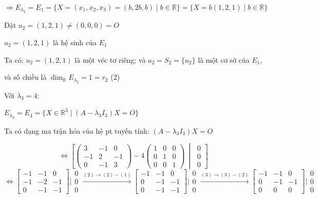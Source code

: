 \documentclass[12pt,a4paper]{article}
\newcommand{\R}{\mathbb{R}}
\begin{document}
\[
\Rightarrow E_{\lambda_2}=E_1=\{X=(x_1,x_2,x_3)=(b,2b,b)\mid b\in\R\}=\{X=b(1,2,1)\mid b\in\R\}
\]

Đặt $u_2=(1,2,1)\neq(0,0,0)=O$

$u_2=(1,2,1)$ là hệ sinh của $E_1$

Ta có: $u_2=(1,2,1)$ là một véc tơ riêng; và $a_2=S_2=\{u_2\}$ là một cơ sở của $E_1$,

và số chiều là $\dim_\R E_{\lambda_2}=1=r_2$ \hfill (2)

\medskip
Với $\lambda_3=4$:

$E_{\lambda_3}=E_4=\{X\in\R^3 \mid (A-\lambda_3I_3)X=O\}$

Ta có dạng ma trận hóa của hệ pt tuyến tính: $(A-\lambda_3I_3)X=O$

\[
\Leftrightarrow
\left[\begin{pmatrix}3 & -1 & 0\\ -1 & 2 & -1\\ 0 & -1 & 3\end{pmatrix}-4\begin{pmatrix}1&0&0\\0&1&0\\0&0&1\end{pmatrix}\ \middle|\ \begin{matrix}0\\0\\0\end{matrix}\right]
\]
\[
\Leftrightarrow
\begin{bmatrix}-1 & -1 & 0\\ -1 & -2 & -1\\ 0 & -1 & -1\end{bmatrix}\big|\begin{matrix}0\\0\\0\end{matrix}
\xrightarrow{(2)\to(2)-(1)}
\begin{bmatrix}-1 & -1 & 0\\ 0 & -1 & -1\\ 0 & -1 & -1\end{bmatrix}\big|\begin{matrix}0\\0\\0\end{matrix}
\xrightarrow{(3)\to(3)-(2)}
\begin{bmatrix}-1 & -1 & 0\\ 0 & -1 & -1\\ 0 & 0 & 0\end{bmatrix}\big|\begin{matrix}0\\0\\0\end{matrix}
\]
\end{document}
